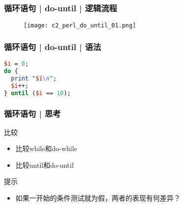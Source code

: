 \begin{frame}
  \frametitle{循环语句 | do-until | 逻辑流程}
  \begin{figure}
    \centering
    \texttt{[image: c2\_perl\_do\_until\_01.png]}
  \end{figure}
\end{frame}

\begin{frame}[fragile]
  \frametitle{循环语句 | do-until | 语法}
\begin{lstlisting}[language=Perl]
$i = 0;
do {
  print "$i\n";
  $i++;
} until ($i == 10);
\end{lstlisting}
\end{frame}

\begin{frame}
  \frametitle{循环语句 | 思考}
  \begin{block}{比较}
    \begin{itemize}
      \item 比较while和do-while
      \item 比较until和do-until
    \end{itemize}
  \end{block}
  \pause
  \begin{block}{提示}
    \begin{itemize}
      \item 如果一开始的条件测试就为假，两者的表现有何差异？
    \end{itemize}
  \end{block}
\end{frame}


